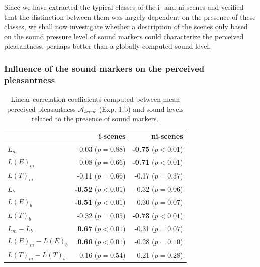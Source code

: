 \documentclass[12pt]{elsarticle}
\begin{document}
Since we have extracted the typical classes of the i- and ni-scenes and verified that the distinction between them was largely dependent on the presence of these classes, we shall now investigate whether a description of the scenes only based on the sound pressure level of sound markers could characterize the perceived pleasantness, perhaps better than a globally computed sound level.

\subsubsection*{Influence of the sound markers on the perceived pleasantness}

\begin{table}[t]
\setlength{\tabcolsep}{3pt}
\centering
{\renewcommand{\arraystretch}{1}
\centering
\begin{tabular}{l r r}
                  &   i-scenes                  & ni-scenes \\
\hline
$L_m$              & 0.03  ($p=0.88$)           & \textbf{-0.75} ($p<0.01$) \\
$L(E)_m$           & 0.08  ($p=0.66$)           & \textbf{-0.71} ($p<0.01$) \\
$L(T)_m$           & -0.11 ($p=0.66$)           & -0.17 ($p=0.37$) \\
$L_b$              & \textbf{-0.52} ($p<0.01$)  & -0.32 ($p=0.06$) \\
$L(E)_b$           & \textbf{-0.51} ($p<0.01$)  & -0.30 ($p=0.07$) \\
$L(T)_b$           & -0.32 ($p=0.05$)           & \textbf{-0.73} ($p<0.01$) \\
$L_m-L_b$          & \textbf{0.67} ($p<0.01$)   & -0.31 ($p=0.07$) \\
$L(E)_m-L(E)_b$    & \textbf{0.66} ($p<0.01$)   & -0.28 ($p=0.10$) \\
$L(T)_m-L(T)_b$    & 0.16 ($p=0.54$)            & 0.21 ($p=0.28$) \\
\hline
\end{tabular}
}
\vspace{0.5mm}
\caption{Linear correlation coefficients computed between mean perceived pleasantness $\mathcal{A}_{scene}$ (Exp. 1.b) and sound levels related to the presence of sound markers.}
\label{tab:corrMarkers}
\end{table}
\end{document}
